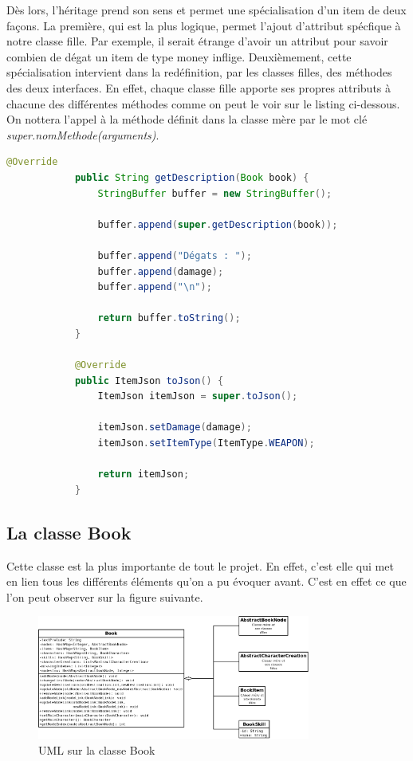 			Dès lors, l'héritage prend son sens et permet une spécialisation d'un item de deux façons. La première, qui est la plus logique, permet l'ajout d'attribut spécfique à notre classe fille. Par exemple, il serait étrange d'avoir un attribut pour savoir combien de dégat un item de type money inflige. Deuxièmement, cette spécialisation intervient dans la redéfinition, par les classes filles, des méthodes des deux interfaces. En effet, chaque classe fille apporte ses propres attributs à chacune des différentes méthodes comme on peut le voir sur le listing ci-dessous. On nottera l'appel à la méthode définit dans la classe mère par le mot clé \textit{super.nomMethode(arguments)}.

			\begin{lstlisting}[gobble=12, language=Java, caption=Exemple de spécialisation des items]
			@Override
			public String getDescription(Book book) {
				StringBuffer buffer = new StringBuffer();

				buffer.append(super.getDescription(book));

				buffer.append("Dégats : ");
				buffer.append(damage);
				buffer.append("\n");

				return buffer.toString();
			}

			@Override
			public ItemJson toJson() {
				ItemJson itemJson = super.toJson();

				itemJson.setDamage(damage);
				itemJson.setItemType(ItemType.WEAPON);

				return itemJson;
			}
			\end{lstlisting}

		\subsection{La classe Book}

			Cette classe est la plus importante de tout le projet. En effet, c'est elle qui met en lien tous les différents éléments qu'on a pu évoquer avant. C'est en effet ce que l'on peut observer sur la figure suivante.

			\begin{figure}[H]
				\centering\includegraphics[width=0.8\textwidth, keepaspectratio]{img/book.png}
				\caption{UML sur la classe Book}
			\end{figure}

